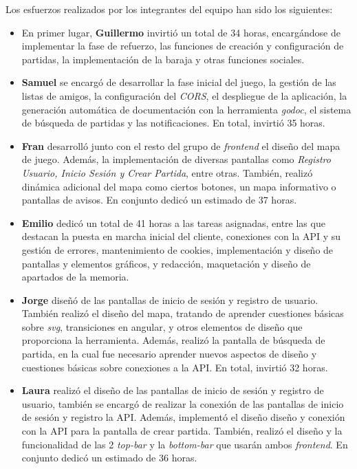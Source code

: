 \documentclass[11pt, a4paper, titlepage]{article}
\begin{document}
Los esfuerzos realizados por los integrantes del equipo han sido los siguientes:

\begin{itemize}
    \item En primer lugar, \textbf{Guillermo} invirtió un total de 34 horas, encargándose de implementar la fase de refuerzo, las funciones de creación y configuración de partidas, la implementación de la baraja y otras funciones sociales.

    \item \textbf{Samuel} se encargó de desarrollar la fase inicial del juego, la gestión de las listas de amigos, la configuración del \textit{CORS}, el despliegue de la aplicación, la generación automática de documentación con la herramienta \textit{godoc}, el sistema de búsqueda de partidas y las notificaciones. En total, invirtió 35 horas.

    \item \textbf{Fran} desarrolló junto con el resto del grupo de \textit{frontend} el diseño del mapa de juego. Además, la implementación de diversas pantallas como \textit{Registro Usuario, Inicio Sesión y Crear Partida}, entre otras. También, realizó dinámica adicional del mapa como ciertos botones, un mapa informativo o pantallas de avisos. En conjunto dedicó un estimado de 37 horas.

    \item \textbf{Emilio} dedicó un total de 41 horas a las tareas asignadas, entre las que destacan la puesta en marcha inicial del cliente, conexiones con la API y su gestión de errores, mantenimiento de cookies, implementación y diseño de pantallas y elementos gráficos, y redacción, maquetación y diseño de apartados de la memoria.

    \item \textbf{Jorge} diseñó de las pantallas de inicio de sesión y registro de usuario. También realizó el diseño del mapa, tratando de aprender cuestiones básicas sobre \textit{svg}, transiciones en angular, y otros elementos de diseño que proporciona la herramienta. Además, realizó la pantalla de búsqueda de partida, en la cual fue necesario aprender nuevos aspectos de diseño y cuestiones básicas sobre conexiones a la API. En total, invirtió 32 horas.

    \item \textbf{Laura} realizó el diseño de las pantallas de inicio de sesión y registro de usuario, también se encargó de realizar la conexión de las pantallas de inicio de sesión y registro la API. Además, implementó el diseño diseño y conexión con la API para la pantalla de crear partida. También, realizó el diseño y la funcionalidad de las 2 \textit{top-bar} y la \textit{bottom-bar} que usarán ambos \textit{frontend}. En conjunto dedicó un estimado de 36 horas.
\end{itemize}
\end{document}
